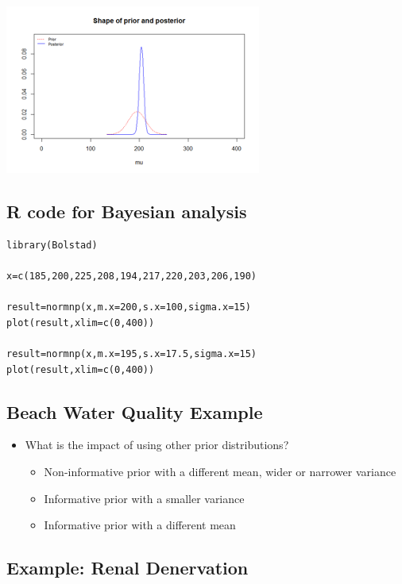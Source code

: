 \documentclass[
]{book}
\providecommand{\tightlist}{%
  \setlength{\itemsep}{0pt}\setlength{\parskip}{0pt}}
\begin{document}
\includegraphics[width=0.5\linewidth]{./6_34b}

\hypertarget{r-code-for-bayesian-analysis}{%
\subsection{R code for Bayesian analysis}\label{r-code-for-bayesian-analysis}}

\begin{verbatim}
library(Bolstad)

x=c(185,200,225,208,194,217,220,203,206,190)

result=normnp(x,m.x=200,s.x=100,sigma.x=15)
plot(result,xlim=c(0,400))

result=normnp(x,m.x=195,s.x=17.5,sigma.x=15)
plot(result,xlim=c(0,400))
\end{verbatim}

\hypertarget{beach-water-quality-example}{%
\subsection{Beach Water Quality Example}\label{beach-water-quality-example}}

\begin{itemize}
\tightlist
\item
  What is the impact of using other prior distributions?

  \begin{itemize}
  \tightlist
  \item
    Non-informative prior with a different mean, wider or narrower variance
  \item
    Informative prior with a smaller variance
  \item
    Informative prior with a different mean
  \end{itemize}
\end{itemize}

\hypertarget{example-renal-denervation}{%
\subsection{Example: Renal Denervation}\label{example-renal-denervation}}
\end{document}
